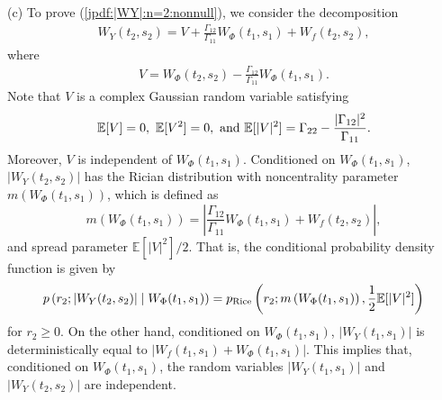 \documentclass{amsart}
\begin{document}
(c) To prove (\ref{jpdf:|WY|:n=2:nonnull}), we consider the decomposition
\begin{align*}%
W_{Y}(t_{2},s_{2}) = V+\frac{\Gamma_{12}}{\Gamma_{11}}W_{\Phi}(t_{1},s_{1})+W_{f}(t_{2},s_{2}),
\end{align*}
where
\begin{align*}
V = W_{\Phi}(t_{2},s_{2})-\frac{\Gamma_{12}}{\Gamma_{11}} W_{\Phi}(t_{1},s_{1}).
\end{align*}
Note that $V$ is a complex Gaussian random variable satisfying
$$\mathbb{E}[V]=0,\
\mathbb{E}[V^{2}]=0,\ \textup{and}\
\mathbb{E}[|V|^{2}]=\Gamma_{22}-\frac{|\Gamma_{12}|^{2}}{\Gamma_{11}}.$$
Moreover, $V$ is independent of $W_{\Phi}(t_{1},s_{1})$.
Conditioned on $W_{\Phi}(t_{1},s_{1})$,
$|W_{Y}(t_{2},s_{2})|$ has the Rician distribution with
noncentrality parameter $m(W_{\Phi}(t_{1},s_{1}))$, which is defined as
$$
m\left(W_{\Phi}(t_{1},s_{1})\right)=\left|\frac{\Gamma_{12}}{\Gamma_{11}}W_{\Phi}(t_{1},s_{1})+W_{f}(t_{2},s_{2})\right|,
$$
and spread parameter $\mathbb{E}[|V|^{2}]/2$.
That is, the conditional probability density function is given by
\begin{align*}%
p\left(r_{2};|W_{Y}(t_{2},s_{2})|\mid W_{\Phi}(t_{1},s_{1})\right)
=
p_{\textup{Rice}}\left(r_{2};m\left(W_{\Phi}(t_{1},s_{1})\right),
\frac{1}{2}\mathbb{E}[|V|^{2}]\right)
\end{align*}
for $r_{2}\geq0$.
On the other hand, conditioned on $W_{\Phi}(t_{1},s_{1})$, $|W_{Y}(t_{1},s_{1})|$ is deterministically equal to $|W_{f}(t_{1},s_{1})+W_{\Phi}(t_{1},s_{1})|$.
This implies that, conditioned on $W_{\Phi}(t_{1},s_{1})$,
the random variables $|W_{Y}(t_{1},s_{1})|$ and $|W_{Y}(t_{2},s_{2})|$ are independent.
\end{document}
